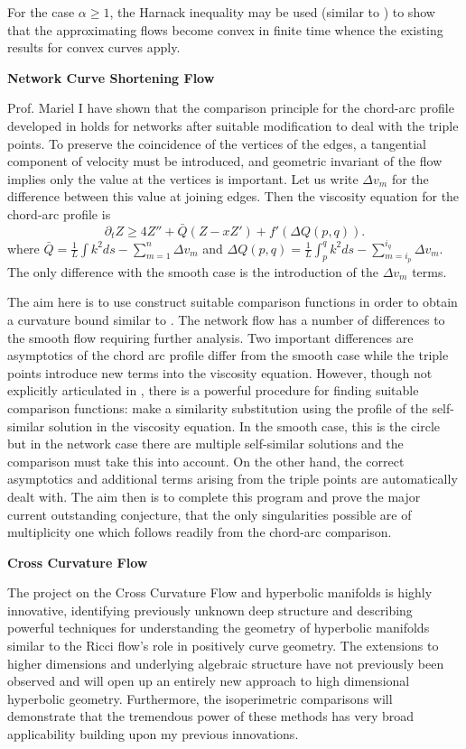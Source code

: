\documentclass[12pt]{amsart}
\begin{document}
For the case $\alpha \geq 1$, the Harnack inequality may be used (similar to \cite{MR1094458}) to show that the approximating flows become convex in finite time whence the existing results for convex curves apply.

\noindent\textbf{Network Curve Shortening Flow}
\label{sec-3-6}

Prof. Mariel \saez I have shown that the comparison principle for the chord-arc profile developed in \cite{MR2794630} holds for networks after suitable modification to deal with the triple points. To preserve the coincidence of the vertices of the edges, a tangential component of velocity must be introduced, and geometric invariant of the flow implies only the value at the vertices is important. Let us write $\Delta v_m$ for the difference between this value at joining edges. Then the viscosity equation for the chord-arc profile is
\[
\partial_t Z \geq 4Z''+\bar{Q}(Z-xZ')+f'(\Delta Q(p,q)).
\]
where $\bar{Q}=\frac{1}{L}\int k^2 ds-\sum_{m=1}^n \Delta v_m$ and $\Delta Q(p,q)=\frac{1}{L}\int_p^q k^2 ds-\sum_{m=i_p}^{i_q} \Delta v_m$. The only difference with the smooth case is the introduction of the $\Delta v_m$ terms.

The aim here is to use construct suitable comparison functions in order to obtain a curvature bound similar to \cite{MR2794630}. The network flow has a number of differences to the smooth flow requiring further analysis. Two important differences are asymptotics of the chord arc profile differ from the smooth case while the triple points introduce new terms into the viscosity equation. However, though not explicitly articulated in \cite{MR2794630}, there is a powerful procedure for finding suitable comparison functions: make a similarity substitution using the profile of the self-similar solution in the viscosity equation. In the smooth case, this is the circle but in the network case there are multiple self-similar solutions and the comparison must take this into account. On the other hand, the correct asymptotics and additional terms arising from the triple points are automatically dealt with. The aim then is to complete this program and prove the major current outstanding conjecture, that the only singularities possible are of multiplicity one which follows readily from the chord-arc comparison.

\noindent\textbf{Cross Curvature Flow}
\label{sec-3-7}

The project on the Cross Curvature Flow and hyperbolic manifolds is highly innovative, identifying previously unknown deep structure and describing powerful techniques for understanding the geometry of hyperbolic manifolds similar to the Ricci flow's role in positively curve geometry. The extensions to higher dimensions and underlying algebraic structure have not previously been observed and will open up an entirely new approach to high dimensional hyperbolic geometry. Furthermore, the isoperimetric comparisons will demonstrate that the tremendous power of these methods has very broad applicability building upon my previous innovations.
\end{document}

